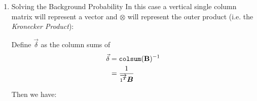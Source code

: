 \documentclass[11pt]{article}
\begin{document}
\begin{enumerate}
\item Solving the Background Probability
\label{sec:orgc1a256d}
In this case a vertical single column matrix will represent a vector and \(\otimes\) will represent the outer product (i.e. the \emph{Kronecker Product}):



Define \(\vec{\delta}\) as the column sums of
\[\begin{aligned}
     \vec{\delta} & = \mathtt{colsum} (\text{{\bfseries{B}}})^{- 1}\\
     & = \frac{1}{\overrightarrow{1^{{\scriptsize \ensuremath{\boldsymbol{T}}}}}
     \ensuremath{\boldsymbol{B}}}
   \end{aligned}\]


Then we have:



\end{enumerate}
\end{document}
